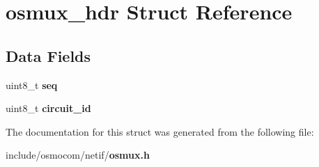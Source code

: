 \section{osmux\+\_\+hdr Struct Reference}
\label{structosmux__hdr}
\subsection*{Data Fields}
\begin{DoxyCompactItemize}
\item 
uint8\+\_\+t {\bfseries seq}\label{structosmux__hdr_a196aed00388a65b126a72a76680699b8}

\item 
uint8\+\_\+t {\bfseries circuit\+\_\+id}\label{structosmux__hdr_a281e689bfae94a2034769a96e48dc64b}

\end{DoxyCompactItemize}


The documentation for this struct was generated from the following file\+:\begin{DoxyCompactItemize}
\item 
include/osmocom/netif/{\bf osmux.\+h}\end{DoxyCompactItemize}
